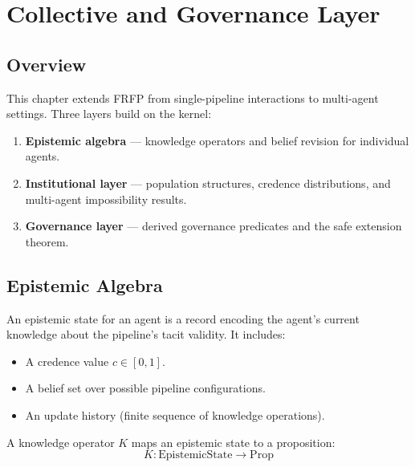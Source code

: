 \section{Collective and Governance Layer}
\label{ch:collective}

\subsection{Overview}

This chapter extends FRFP from single-pipeline interactions to multi-agent
settings. Three layers build on the kernel:

\begin{enumerate}
  \item \textbf{Epistemic algebra} --- knowledge operators and belief revision
        for individual agents.
  \item \textbf{Institutional layer} --- population structures, credence
        distributions, and multi-agent impossibility results.
  \item \textbf{Governance layer} --- derived governance predicates and the
        safe extension theorem.
\end{enumerate}

\subsection{Epistemic Algebra}

\begin{definition}
An epistemic state for an agent is a record encoding the agent's current
knowledge about the pipeline's tacit validity. It includes:
\begin{itemize}
  \item A credence value $c \in [0,1]$.
  \item A belief set over possible pipeline configurations.
  \item An update history (finite sequence of knowledge operations).
\end{itemize}
\end{definition}

\begin{definition}
A knowledge operator $K$ maps an epistemic state to a proposition:
\[
  K : \mathrm{EpistemicState} \to \mathrm{Prop}
\]
\end{definition}

